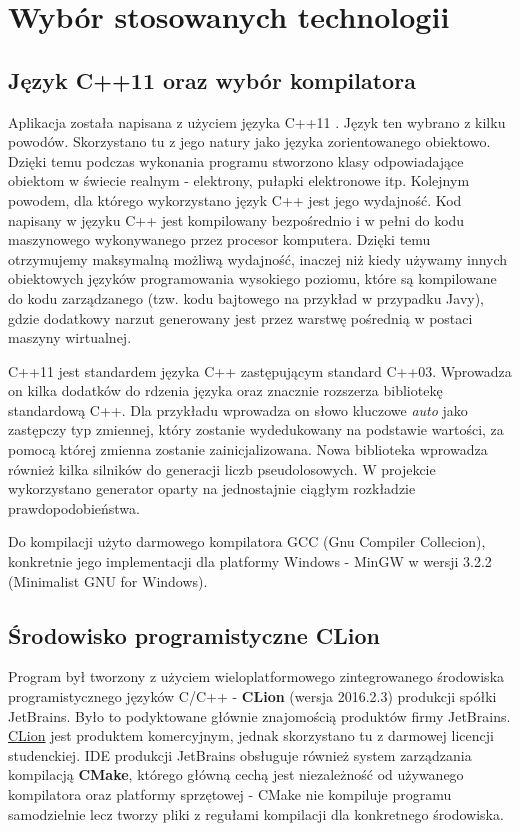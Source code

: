 \chapter{Wybór stosowanych technologii}
\label{tech:all}
\section{Język C++11 oraz wybór kompilatora}
Aplikacja została napisana z użyciem języka C++11 \cite{c++}. Język ten
wybrano z kilku powodów. Skorzystano tu z jego natury jako języka zorientowanego obiektowo. Dzięki temu podczas wykonania programu stworzono klasy odpowiadające obiektom w świecie realnym - elektrony, pułapki elektronowe itp.
Kolejnym powodem, dla którego wykorzystano język C++ jest jego wydajność. Kod napisany
w języku C++ jest kompilowany bezpośrednio i w pełni do kodu maszynowego  wykonywanego przez procesor komputera. Dzięki temu
otrzymujemy maksymalną możliwą wydajność, inaczej niż kiedy używamy innych
obiektowych języków programowania wysokiego poziomu, które są kompilowane do kodu
zarządzanego (tzw. kodu bajtowego na przykład w przypadku Javy), gdzie dodatkowy narzut
generowany jest przez warstwę pośrednią w postaci maszyny wirtualnej. 

C++11 jest standardem języka C++ zastępującym standard C++03. Wprowadza on kilka dodatków do rdzenia języka oraz znacznie rozszerza bibliotekę standardową C++. Dla przykładu wprowadza on słowo kluczowe \textit{auto} jako zastępczy typ zmiennej, który zostanie wydedukowany na podstawie wartości, za pomocą której zmienna zostanie zainicjalizowana. Nowa biblioteka wprowadza również kilka silników do generacji liczb pseudolosowych. W projekcie wykorzystano generator oparty na jednostajnie ciągłym rozkładzie prawdopodobieństwa.

Do kompilacji użyto darmowego kompilatora GCC (Gnu Compiler Collecion), konkretnie jego implementacji dla platformy Windows - MinGW w wersji 3.2.2 (Minimalist GNU for Windows).

\section{Środowisko programistyczne CLion}
\label{tech:clion}
Program był tworzony z użyciem wieloplatformowego zintegrowanego środowiska programistycznego języków C/C++ - \textbf{CLion} (wersja 2016.2.3) produkcji spółki JetBrains. Było to podyktowane głównie znajomością produktów firmy JetBrains. \href{https://www.jetbrains.com/clion/}{CLion} jest produktem komercyjnym, jednak skorzystano tu z darmowej licencji studenckiej. IDE produkcji JetBrains obsługuje również 	system zarządzania kompilacją \textbf{CMake}, którego główną cechą jest niezależność od używanego kompilatora oraz platformy sprzętowej - CMake nie kompiluje programu samodzielnie lecz tworzy pliki z regułami kompilacji dla konkretnego środowiska.


